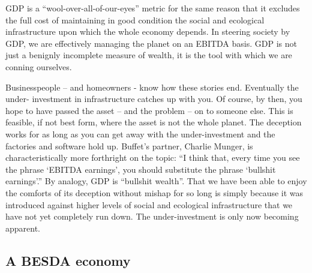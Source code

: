 \documentclass[
]{book}
\begin{document}
GDP is a ``wool-over-all-of-our-eyes'' metric for the same reason that it excludes the full cost
of maintaining in good condition the social and ecological infrastructure upon which the whole
economy depends. In steering society by GDP, we are effectively managing the planet on an
EBITDA basis. GDP is not just a benignly incomplete measure of wealth, it is the tool with
which we are conning ourselves.

Businesspeople -- and homeowners - know how these stories end. Eventually the under-
investment in infrastructure catches up with you. Of course, by then, you hope to have passed
the asset -- and the problem -- on to someone else. This is feasible, if not best form, where the
asset is not the whole planet. The deception works for as long as you can get away with the
under-investment and the factories and software hold up.
Buffet's partner, Charlie Munger, is characteristically more forthright on the topic:
``I think that, every time you see the phrase `EBITDA earnings', you should
substitute the phrase `bullshit earnings'.''
By analogy, GDP is ``bullshit wealth''. That we have been able to enjoy the comforts of its
deception without mishap for so long is simply because it was introduced against higher
levels of social and ecological infrastructure that we have not yet completely run down. The
under-investment is only now becoming apparent.

\hypertarget{a-besda-economy}{%
\subsection{A BESDA economy}\label{a-besda-economy}}
\end{document}

